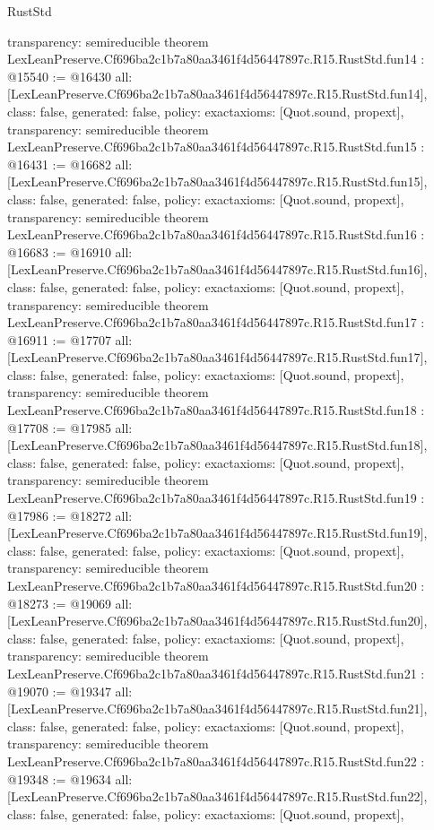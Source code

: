 \begin{lexlean}{RustStd}
\begin{coremodule}
{  transparency: semireducible
}
theorem LexLeanPreserve.Cf696ba2c1b7a80aa3461f4d56447897c.R15.RustStd.fun14 : @15540 := @16430 {
  all: [LexLeanPreserve.Cf696ba2c1b7a80aa3461f4d56447897c.R15.RustStd.fun14],
  class: false,
  generated: false,
  policy: exact{axioms: [Quot.sound, propext]},
  transparency: semireducible
}
theorem LexLeanPreserve.Cf696ba2c1b7a80aa3461f4d56447897c.R15.RustStd.fun15 : @16431 := @16682 {
  all: [LexLeanPreserve.Cf696ba2c1b7a80aa3461f4d56447897c.R15.RustStd.fun15],
  class: false,
  generated: false,
  policy: exact{axioms: [Quot.sound, propext]},
  transparency: semireducible
}
theorem LexLeanPreserve.Cf696ba2c1b7a80aa3461f4d56447897c.R15.RustStd.fun16 : @16683 := @16910 {
  all: [LexLeanPreserve.Cf696ba2c1b7a80aa3461f4d56447897c.R15.RustStd.fun16],
  class: false,
  generated: false,
  policy: exact{axioms: [Quot.sound, propext]},
  transparency: semireducible
}
theorem LexLeanPreserve.Cf696ba2c1b7a80aa3461f4d56447897c.R15.RustStd.fun17 : @16911 := @17707 {
  all: [LexLeanPreserve.Cf696ba2c1b7a80aa3461f4d56447897c.R15.RustStd.fun17],
  class: false,
  generated: false,
  policy: exact{axioms: [Quot.sound, propext]},
  transparency: semireducible
}
theorem LexLeanPreserve.Cf696ba2c1b7a80aa3461f4d56447897c.R15.RustStd.fun18 : @17708 := @17985 {
  all: [LexLeanPreserve.Cf696ba2c1b7a80aa3461f4d56447897c.R15.RustStd.fun18],
  class: false,
  generated: false,
  policy: exact{axioms: [Quot.sound, propext]},
  transparency: semireducible
}
theorem LexLeanPreserve.Cf696ba2c1b7a80aa3461f4d56447897c.R15.RustStd.fun19 : @17986 := @18272 {
  all: [LexLeanPreserve.Cf696ba2c1b7a80aa3461f4d56447897c.R15.RustStd.fun19],
  class: false,
  generated: false,
  policy: exact{axioms: [Quot.sound, propext]},
  transparency: semireducible
}
theorem LexLeanPreserve.Cf696ba2c1b7a80aa3461f4d56447897c.R15.RustStd.fun20 : @18273 := @19069 {
  all: [LexLeanPreserve.Cf696ba2c1b7a80aa3461f4d56447897c.R15.RustStd.fun20],
  class: false,
  generated: false,
  policy: exact{axioms: [Quot.sound, propext]},
  transparency: semireducible
}
theorem LexLeanPreserve.Cf696ba2c1b7a80aa3461f4d56447897c.R15.RustStd.fun21 : @19070 := @19347 {
  all: [LexLeanPreserve.Cf696ba2c1b7a80aa3461f4d56447897c.R15.RustStd.fun21],
  class: false,
  generated: false,
  policy: exact{axioms: [Quot.sound, propext]},
  transparency: semireducible
}
theorem LexLeanPreserve.Cf696ba2c1b7a80aa3461f4d56447897c.R15.RustStd.fun22 : @19348 := @19634 {
  all: [LexLeanPreserve.Cf696ba2c1b7a80aa3461f4d56447897c.R15.RustStd.fun22],
  class: false,
  generated: false,
  policy: exact{axioms: [Quot.sound, propext]},
}
\end{coremodule}
\end{lexlean}

